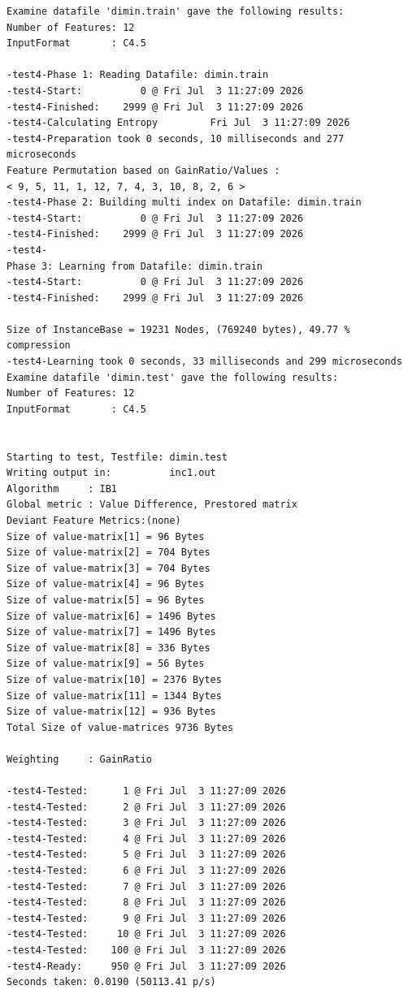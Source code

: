 \documentclass{report}
\begin{document}
\begin{footnotesize}
\begin{verbatim}
Examine datafile 'dimin.train' gave the following results:
Number of Features: 12
InputFormat       : C4.5

-test4-Phase 1: Reading Datafile: dimin.train
-test4-Start:          0 @ Fri Jul  3 11:27:09 2026
-test4-Finished:    2999 @ Fri Jul  3 11:27:09 2026
-test4-Calculating Entropy         Fri Jul  3 11:27:09 2026
-test4-Preparation took 0 seconds, 10 milliseconds and 277 microseconds
Feature Permutation based on GainRatio/Values :
< 9, 5, 11, 1, 12, 7, 4, 3, 10, 8, 2, 6 >
-test4-Phase 2: Building multi index on Datafile: dimin.train
-test4-Start:          0 @ Fri Jul  3 11:27:09 2026
-test4-Finished:    2999 @ Fri Jul  3 11:27:09 2026
-test4-
Phase 3: Learning from Datafile: dimin.train
-test4-Start:          0 @ Fri Jul  3 11:27:09 2026
-test4-Finished:    2999 @ Fri Jul  3 11:27:09 2026

Size of InstanceBase = 19231 Nodes, (769240 bytes), 49.77 % compression
-test4-Learning took 0 seconds, 33 milliseconds and 299 microseconds
Examine datafile 'dimin.test' gave the following results:
Number of Features: 12
InputFormat       : C4.5


Starting to test, Testfile: dimin.test
Writing output in:          inc1.out
Algorithm     : IB1
Global metric : Value Difference, Prestored matrix
Deviant Feature Metrics:(none)
Size of value-matrix[1] = 96 Bytes
Size of value-matrix[2] = 704 Bytes
Size of value-matrix[3] = 704 Bytes
Size of value-matrix[4] = 96 Bytes
Size of value-matrix[5] = 96 Bytes
Size of value-matrix[6] = 1496 Bytes
Size of value-matrix[7] = 1496 Bytes
Size of value-matrix[8] = 336 Bytes
Size of value-matrix[9] = 56 Bytes
Size of value-matrix[10] = 2376 Bytes
Size of value-matrix[11] = 1344 Bytes
Size of value-matrix[12] = 936 Bytes
Total Size of value-matrices 9736 Bytes

Weighting     : GainRatio

-test4-Tested:      1 @ Fri Jul  3 11:27:09 2026
-test4-Tested:      2 @ Fri Jul  3 11:27:09 2026
-test4-Tested:      3 @ Fri Jul  3 11:27:09 2026
-test4-Tested:      4 @ Fri Jul  3 11:27:09 2026
-test4-Tested:      5 @ Fri Jul  3 11:27:09 2026
-test4-Tested:      6 @ Fri Jul  3 11:27:09 2026
-test4-Tested:      7 @ Fri Jul  3 11:27:09 2026
-test4-Tested:      8 @ Fri Jul  3 11:27:09 2026
-test4-Tested:      9 @ Fri Jul  3 11:27:09 2026
-test4-Tested:     10 @ Fri Jul  3 11:27:09 2026
-test4-Tested:    100 @ Fri Jul  3 11:27:09 2026
-test4-Ready:     950 @ Fri Jul  3 11:27:09 2026
Seconds taken: 0.0190 (50113.41 p/s)


\end{verbatim}
\end{footnotesize}
\end{document}
